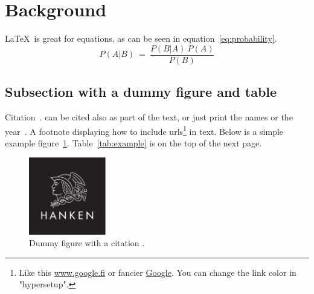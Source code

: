 \documentclass[12pt, a4paper, oneside]{article}
\begin{document}
\clearpage


\section{Background} \label{sec:background}

\blindtext

\LaTeX~is great for equations, as can be seen in equation~\ref{eq:probability}.
\begin{equation} \label{eq:probability}
    P(A | B) \ = \ \frac{P(B | A) \ P(A)}{P(B)}
\end{equation}

\subsection{Subsection with a dummy figure and table} \label{subsec:subsection-with-a-dummy-figure-and-table}

Citation~\citep{hermanson2020anatomy, petersen2005advances}.
\citet{petersen2005advances} can be cited also as part of the text,
or just print the names \citeauthor{petersen2005advances} or the year~\citeyear{petersen2005advances}.
A footnote displaying how to include urls\footnote{Like this \url{www.google.fi} or fancier \href{www.google.fi}{Google}.
    You can change the link color in "hypersetup".} in text.
Below is a simple example figure~\ref{fig:figure}.
Table~\ref{tab:example} is on the top of the next page.

\begin{figure}[h]
    \centering
    \includegraphics[width=0.3\textwidth]{hanken_logo_platta}
    \caption[Dummy figure]{Dummy figure with a citation \citep{mellersh2014genetics}.}
    \label{fig:figure}
\end{figure}

\blindtext[2]
\end{document}
